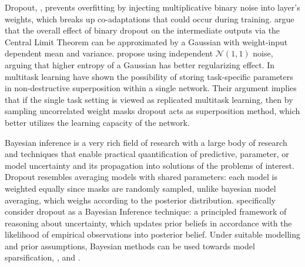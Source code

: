 \documentclass[a4paper,10pt]{article}
\begin{document}
Dropout, \citep{hinton_improving_2012}, prevents overfitting by injecting multiplicative
binary noise into layer's weights, which breaks up co-adaptations that could occur
during training. \citet{wang_fast_2013} argue that the overall effect of binary dropout
on the intermediate outputs via the Central Limit Theorem can be approximated by a Gaussian
with weight-input dependent mean and variance. \citet{srivastava_dropout_2014} propose
using independent $\mathcal{N}(1,1)$ noise, arguing that higher entropy of a Gaussian has
better regularizing effect. In multitask learning \citet{cheung_superposition_2019}
have shown the possibility of storing task-specific parameters in non-destructive superposition
within a single network. Their argument implies that if the single task setting is viewed
as replicated multitask learning, then by sampling uncorrelated weight masks dropout acts
as superposition method, which better utilizes the learning capacity of the network.

Bayesian inference is a very rich field of research with a large body of research and
techniques that enable practical quantification of predictive, parameter, or model
uncertainty and its propagation into solutions of the problems of interest.
%
Dropout resembles averaging models with shared parameters: each model is weighted equally
since masks are randomly sampled, unlike bayesian model averaging, which weighs according to
the posterior distribution. \citet{kingma_variational_2015} specifically consider dropout
as a Bayesian Inference technique: a principled framework of reasoning about uncertainty,
which updates prior beliefs in accordance with the likelihood of empirical observations
into posterior belief. Under suitable modelling and prior assumptions, Bayesian methods
can be used towards model sparsification, \citep{kingma_variational_2015,molchanov_variational_2017},
and \citep{kharitonov_variational_2018}.
\end{document}

